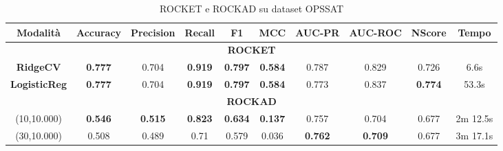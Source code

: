 \begin{table}[h!]
    \centering %
    \begin{adjustbox}{max width=\textwidth}
        \begin{tabular}{|c|c|c|c|c|c|c|c|c|c|}
        \hline
        \textbf{Modalità} & \textbf{Accuracy} &\textbf{Precision}  & \textbf{Recall} & \textbf{F1} & \textbf{MCC} & \textbf{AUC-PR} & \textbf{AUC-ROC} & \textbf{NScore}&\textbf{Tempo}\\
        \hline
        \multicolumn{10}{|c|}{\textbf{ROCKET}} \\
        \hline
         \textbf{RidgeCV} &\textbf{ 0.777} & 0.704 & \textbf{0.919} &\textbf{0.797}  & \textbf{0.584} & 0.787& 0.829 &0.726&6.6s \\
        \hline
        \textbf{LogisticReg} & \textbf{0.777} & 0.704 & \textbf{0.919} &\textbf{0.797}  &\textbf{ 0.584} & 0.773& 0.837 &\textbf{0.774} &53.3s\\
        \hline
        \multicolumn{10}{|c|}{\textbf{ROCKAD}} \\
        \hline
        (10,10.000)&\textbf{0.546} &\textbf{0.515} &\textbf{0.823} &\textbf{0.634} & \textbf{0.137}& 0.757& 0.704&0.677& 2m 12.5s\\
        \hline
        (30,10.000)&0.508 &0.489 &0.71 &0.579 &0.036 &\textbf{0.762} &\textbf{0.709}& 0.677& 3m 17.1s\\
        \hline
        \end{tabular}
    \end{adjustbox}
    \caption{ROCKET e ROCKAD su dataset OPS\textunderscore SAT}
    \label{tab: ROCKET_ROCKAT_OPS_SAT}
\end{table}



